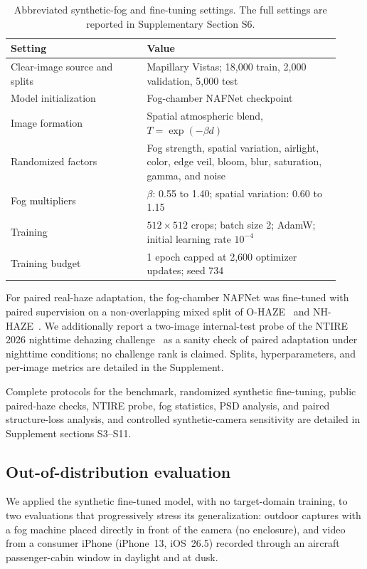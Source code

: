 \documentclass{optica-article}
\begin{document}
\begin{table}[htbp]
\centering
\small
\caption{Abbreviated synthetic-fog and fine-tuning settings. The full
settings are reported in Supplementary Section S6.}
\label{tab:synthetic_settings_short}
\begin{tabular}{p{0.38\linewidth}p{0.54\linewidth}}
\toprule
\textbf{Setting} & \textbf{Value} \\
\midrule
Clear-image source and splits & Mapillary Vistas; 18{,}000 train, 2{,}000 validation, 5{,}000 test \\
Model initialization & Fog-chamber NAFNet checkpoint \\
Image formation & Spatial atmospheric blend, $T=\exp(-\beta d)$ \\
Randomized factors & Fog strength, spatial variation, airlight, color, edge veil, bloom, blur, saturation, gamma, and noise \\
Fog multipliers & $\beta$: 0.55 to 1.40; spatial variation: 0.60 to 1.15 \\
Training & $512\times512$ crops; batch size 2; AdamW; initial learning rate $10^{-4}$ \\
Training budget & 1 epoch capped at 2{,}600 optimizer updates; seed 734 \\
\bottomrule
\end{tabular}
\end{table}

For paired real-haze adaptation, the fog-chamber NAFNet was
fine-tuned with paired supervision on a non-overlapping mixed split
of O-HAZE~\cite{ancuti2018ohaze} and NH-HAZE~\cite{ancuti2020nhhaze}.
We additionally report a two-image internal-test probe of the NTIRE
2026 nighttime dehazing
challenge~\cite{ancuti2026ntire,ancuti2026nt} as a sanity check
of paired adaptation under nighttime conditions; no challenge rank
is claimed. Splits, hyperparameters, and per-image metrics are
detailed in the Supplement.

Complete protocols for the benchmark, randomized synthetic fine-tuning, public
paired-haze checks, NTIRE probe, fog statistics, PSD analysis, and
paired structure-loss analysis, and controlled synthetic-camera sensitivity
are detailed in Supplement sections S3--S11.
 
\subsection{Out-of-distribution evaluation}
\label{sec:ood}

We applied the synthetic fine-tuned model, with no target-domain
training, to two evaluations that progressively stress its
generalization: outdoor captures with a fog machine placed
directly in front of the camera (no enclosure), and video from a
consumer iPhone (iPhone~13, iOS~26.5) recorded through an aircraft
passenger-cabin window in daylight and at dusk.
\end{document}
